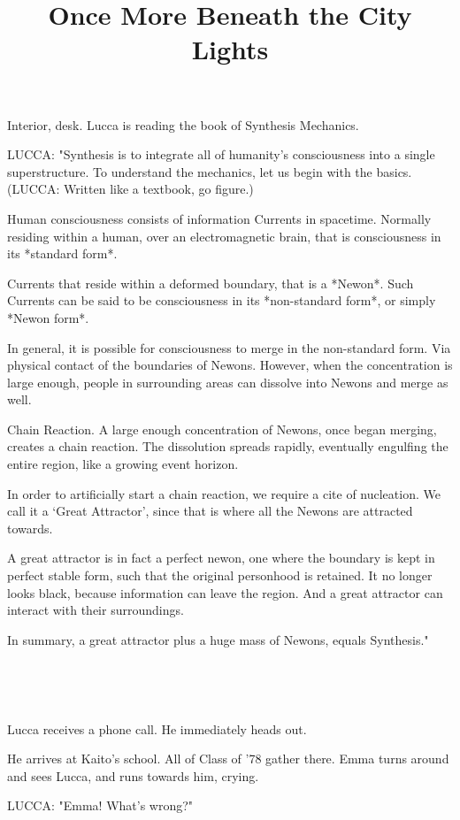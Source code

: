 \documentclass[11pt]{article}
\begin{document}
\ttfamily
\title{Once More Beneath the City Lights}
\maketitle

Interior, desk.
Lucca is reading the book of Synthesis Mechanics.

LUCCA: "Synthesis is to integrate all of humanity's consciousness into a single superstructure.
To understand the mechanics, let us begin with the basics.
(LUCCA: Written like a textbook, go figure.)

Human consciousness consists of information Currents in spacetime.
Normally residing within a human, over an electromagnetic brain, that is consciousness in its *standard form*.

Currents that reside within a deformed boundary, that is a *Newon*.
Such Currents can be said to be consciousness in its *non-standard form*, or simply *Newon form*.

In general, it is possible for consciousness to merge in the non-standard form.
Via physical contact of the boundaries of Newons.
However, when the concentration is large enough, people in surrounding areas can dissolve into Newons and merge as well.

Chain Reaction.
A large enough concentration of Newons, once began merging, creates a chain reaction. 
The dissolution spreads rapidly, eventually engulfing the entire region, like a growing event horizon.

In order to artificially start a chain reaction, we require a cite of nucleation. 
We call it a `Great Attractor', since that is where all the Newons are attracted towards.

A great attractor is in fact a perfect newon, one where the boundary is kept in perfect stable form, such that the original personhood is retained.
It no longer looks black, because information can leave the region.
And a great attractor can interact with their surroundings.

In summary, a great attractor plus a huge mass of Newons, equals Synthesis."

\ 

\ 

Lucca receives a phone call.
He immediately heads out. 

He arrives at Kaito's school.
All of Class of '78 gather there.
Emma turns around and sees Lucca, and runs towards him, crying.

LUCCA: "Emma! What's wrong?"
\end{document}
